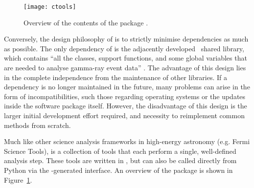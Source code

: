 \begin{figure}[t]
  \centering
  \texttt{[image: ctools]}
  \caption[Overview of .]{Overview of the contents of the  package \cite{Knodlseder2016}.}
  \label{fig:ctools}
\end{figure}

\noindent Conversely, the design philosophy of  is to strictly minimise dependencies as much as possible. The only dependency of  is the adjacently developed  \cpp~shared library, which contains ``all the classes, support functions, and some global variables that are needed to analyse gamma-ray event data'' \cite[][p. 2]{Knodlseder2016}. The advantage of this design lies in the complete independence from the maintenance of other libraries. If a dependency is no longer maintained in the future, many problems can arise in the form of incompatibilities, such those regarding operating systems or the updates inside the software package itself. However, the disadvantage of this design is the larger initial development effort required, and necessity to reimplement common methods from scratch.

Much like other science analysis frameworks in high-energy astronomy (e.g. Fermi Science Tools),  is a collection of tools that each perform a single, well-defined analysis step. These tools are written in \cpp, but can also be called directly from Python via the -generated interface. An overview of the  package is shown in Figure~\ref{fig:ctools}.

